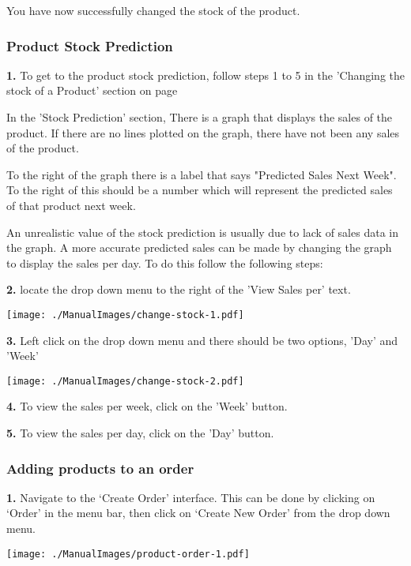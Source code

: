 You have now successfully changed the stock of the product.


\pagebreak
\subsubsection{Product Stock Prediction}
\label{fig:Product Stock Prediction}

\textbf{1.} To get to the product stock prediction, follow steps 1 to 5 in the 'Changing the stock of a Product' section on page \pageref{fig:Changing the stock of a Product}

In the 'Stock Prediction' section, There is a graph that displays the sales of the product. If there are no lines plotted on the graph, there have not been any sales of the product.

To the right of the graph there is a label that says "Predicted Sales Next Week". To the right of this should be a number which will represent the predicted sales of that product next week.

An unrealistic value of the stock prediction is usually due to lack of sales data in the graph. A more accurate predicted sales can be made by changing the graph to display the sales per day. To do this follow the following steps:

\textbf{2.} locate the drop down menu to the right of the 'View Sales per' text.

\texttt{[image: ./ManualImages/change-stock-1.pdf]}

\textbf{3.} Left click on the drop down menu and there should be two options, 'Day' and 'Week'

\texttt{[image: ./ManualImages/change-stock-2.pdf]}

\textbf{4.} To view the sales per week, click on the 'Week' button.

\textbf{5.} To view the sales per day, click on the 'Day' button.

\pagebreak
\subsubsection{Adding products to an order}
\label{fig:Adding products to an order}

\textbf{1.} Navigate to the `Create Order' interface. This can be done by clicking on `Order' in the menu bar, then click on `Create New Order' from the drop down menu.

\texttt{[image: ./ManualImages/product-order-1.pdf]}

